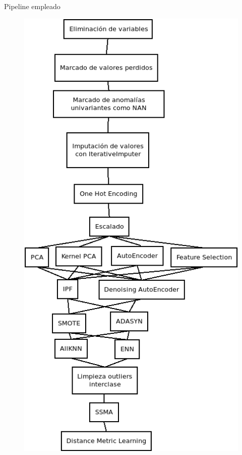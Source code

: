 \begin{frame}{Pipeline empleado}
	\begin{figure}[H]
		\centering
		\includegraphics[scale=0.25]{./figures/knn/pipeline.png}
	\end{figure}
\end{frame}

